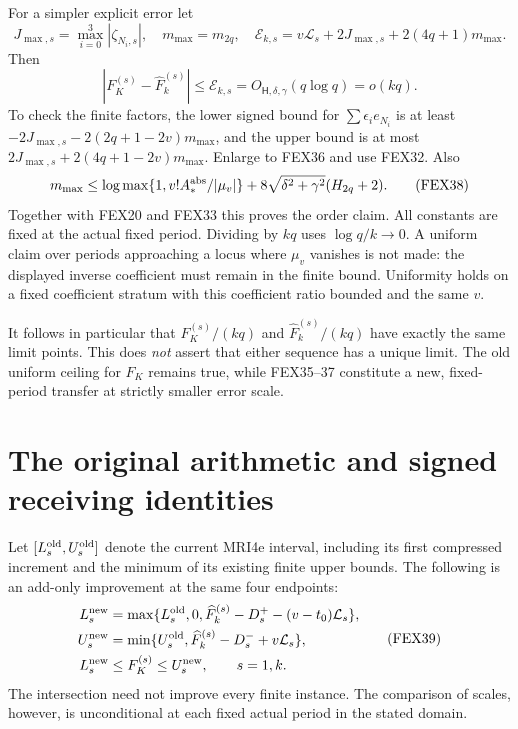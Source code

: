 \documentclass[11pt,a4paper]{article}
\begin{document}
For a simpler explicit error let
\[
 J_{\max,s}=\max_{i=0}^3|\zeta_{N_i,s}|,\quad
 m_{\max}=m_{2q},\quad
 \mathcal E_{k,s}=v\mathcal L_s+2J_{\max,s}+2(4q+1)m_{\max}.
 \tag{FEX36}
\]
Then
\[
 \boxed{|F_K^{(s)}-\widehat F_k^{(s)}|\le\mathcal E_{k,s}
              =O_{\mathsf H,\delta,\gamma}(q\log q)=o(kq).}
 \tag{FEX37}
\]
To check the finite factors, the lower signed bound for $\sum\epsilon_i e_{N_i}$
is at least $-2J_{\max,s}-2(2q+1-2v)m_{\max}$, and the upper bound is at
most $2J_{\max,s}+2(4q+1-2v)m_{\max}$. Enlarge to FEX36 and use
FEX32. Also
\[
 m_{\max}\le
 \log\max\{1,v!A_*^{\rm abs}/|\mu_v|\}
 +8\sqrt{\delta^2+\gamma^2}(H_{2q}+2).
 \tag{FEX38}
\]
Together with FEX20 and FEX33 this proves the order claim. All constants
are fixed at the actual fixed period. Dividing by $kq$ uses
$\log q/k\to0$. A uniform claim over periods approaching a locus where
$\mu_v$ vanishes is not made: the displayed inverse coefficient must
remain in the finite bound. Uniformity holds on a fixed coefficient
stratum with this coefficient ratio bounded and the same $v$.

It follows in particular that $F_K^{(s)}/(kq)$ and
$\widehat F_k^{(s)}/(kq)$ have exactly the same limit points. This does
\emph{not} assert that either sequence has a unique limit. The old
uniform ceiling for $F_K$ remains true, while FEX35--37 constitute a
new, fixed-period transfer at strictly smaller error scale.

\section{The original arithmetic and signed receiving identities}
\label{sec:FEX-receivers}
Let $[L_s^{\rm old},U_s^{\rm old}]$ denote the current MRI4e interval,
including its first compressed increment and the minimum of its existing
finite upper bounds. The following is an add-only improvement at the
same four endpoints:
\[
\begin{split}
 L_s^{\rm new}&=\max\{L_s^{\rm old},0,
            \widehat F_k^{(s)}-D_s^+-(v-t_0)\mathcal L_s\},\\
 U_s^{\rm new}&=\min\{U_s^{\rm old},
            \widehat F_k^{(s)}-D_s^-+v\mathcal L_s\},\\
 L_s^{\rm new}&\le F_K^{(s)}\le U_s^{\rm new},\qquad s=1,k.
\end{split}\tag{FEX39}
\]
The intersection need not improve every finite instance. The comparison
of scales, however, is unconditional at each fixed actual period in
the stated domain.
\end{document}
